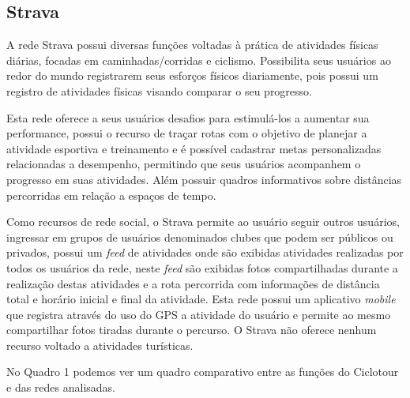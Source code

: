 \subsection{Strava}
A rede Strava \cite{strava} possui diversas funções voltadas à prática de atividades físicas diárias, focadas em caminhadas/corridas e ciclismo. 
Possibilita seus usuários ao redor do mundo registrarem seus esforços físicos diariamente, pois possui um registro de atividades físicas visando 
comparar o seu progresso. 

Esta rede oferece a seus usuários desafios para estimulá-los a aumentar sua performance, possui o recurso de traçar rotas com o objetivo de planejar 
a atividade esportiva e treinamento e é possível cadastrar metas personalizadas relacionadas a desempenho, permitindo que seus usuários 
acompanhem o progresso em suas atividades. Além possuir quadros informativos sobre distâncias percorridas em relação a espaços de tempo. 

Como recursos de rede social, o Strava permite ao usuário seguir outros usuários, ingressar em grupos de usuários 
denominados clubes que podem ser públicos ou privados, possui um \textit{feed} de atividades onde são exibidas atividades realizadas por todos os 
usuários da rede, neste \textit{feed} são exibidas fotos compartilhadas durante a realização destas atividades e a rota percorrida com informações 
de distância total e horário inicial e final da atividade. Esta rede possui um aplicativo \textit{mobile} que registra através do uso do GPS a 
atividade do usuário e permite ao mesmo compartilhar fotos tiradas durante o percurso. O Strava não oferece nenhum recurso voltado a atividades 
turísticas.

No Quadro 1 podemos ver um quadro comparativo entre as funções do Ciclotour e das redes analisadas.

